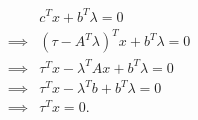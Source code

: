 \documentclass{article}
\begin{document}
\begin{align*}
& c^T x + b^T \lambda = 0 \\
\implies& (\tau - A^T \lambda)^T x + b^T \lambda = 0 \\
\implies& \tau^Tx - \lambda^T A x + b^T \lambda = 0 \\
\implies& \tau^Tx - \lambda^T b + b^T \lambda = 0 \\
\implies& \tau^Tx  = 0.
\end{align*}


\newpage


\end{document}
